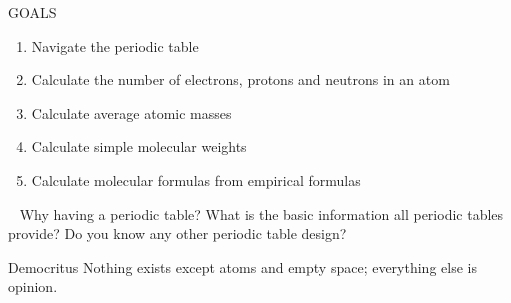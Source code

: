 \documentclass[main.tex]{subfiles}
\begin{document}
\begin{marginfigure}%
\begin{mytcbox}{GOALS}
\begin{enumerate}[label=\protect\circled{\color{white}\arabic*}]
\item Navigate the periodic table
\item Calculate the number of electrons, protons and neutrons in an atom
\item  Calculate average atomic masses
\item  Calculate simple molecular weights
\item  Calculate molecular formulas from empirical formulas
\end{enumerate}
\end{mytcbox}
\vspace{1cm}
\begin{tcolorbox}[enhanced,colback=red!5!white,colframe=black!50!red,boxrule=1pt,
  arc=0pt,outer arc=0pt,drop heavy lifted shadow]
\faGears\ 
 Why having a periodic table? What is the basic information all periodic tables provide? Do you know any other periodic table design? \end{tcolorbox}

\vspace{1cm}    \begin{shadequote}[l]{Democritus}
Nothing exists except atoms and empty space; everything else is opinion.
\end{shadequote}   

\end{marginfigure}%
\end{document}
